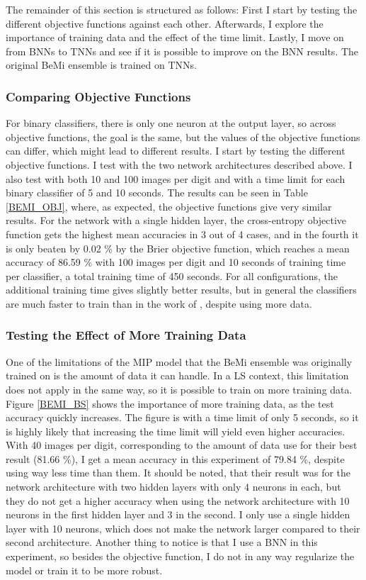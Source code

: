 \noindent The remainder of this section is structured as follows: First I start by testing the different objective functions against each other. Afterwards, I explore the importance of training data and the effect of the time limit. Lastly, I move on from BNNs to TNNs and see if it is possible to improve on the BNN results. The original BeMi ensemble is trained on TNNs. 

\subsubsection{Comparing Objective Functions} 
For binary classifiers, there is only one neuron at the output layer, so across objective functions, the goal is the same, but the values of the objective functions can differ, which might lead to different results. I start by testing the different objective functions. I test with the two network architectures described above. I also test with both 10 and 100 images per digit and with a time limit for each binary classifier of 5 and 10 seconds. The results can be seen in Table \ref{BEMI_OBJ}, where, as expected, the objective functions give very similar results. For the network with a single hidden layer, the cross-entropy objective function gets the highest mean accuracies in 3 out of 4 cases, and in the fourth it is only beaten by 0.02 \% by the Brier objective function, which reaches a mean accuracy of 86.59 \% with 100 images per digit and 10 seconds of training time per classifier, a total training time of 450 seconds. For all configurations, the additional training time gives slightly better results, but in general the classifiers are much faster to train than in the work of \cite{ambrogio2023}, despite using more data. 



\subsubsection{Testing the Effect of More Training Data}
One of the limitations of the MIP model that the BeMi ensemble was originally trained on is the amount of data it can handle. In a LS context, this limitation does not apply in the same way, so it is possible to train on more training data. Figure \ref{BEMI_BS} shows the importance of more training data, as the test accuracy quickly increases. The figure is with a time limit of only 5 seconds, so it is highly likely that increasing the time limit will yield even higher accuracies. With 40 images per digit, corresponding to the amount of data \cite{ambrogio2023} use for their best result (81.66 \%), I get a mean accuracy in this experiment of 79.84 \%, despite using way less time than them. It should be noted, that their result was for the network architecture with two hidden layers with only 4 neurons in each, but they do not get a higher accuracy when using the network architecture with 10 neurons in the first hidden layer and 3 in the second. I only use a single hidden layer with 10 neurons, which does not make the network larger compared to their second architecture. Another thing to notice is that I use a BNN in this experiment, so besides the objective function, I do not in any way regularize the model or train it to be more robust. 

